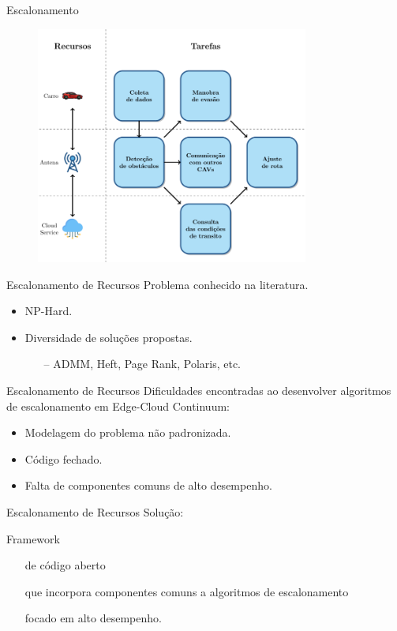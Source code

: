 \begin{frame}{Escalonamento}
    \begin{figure}
        \centering
        \includegraphics[width=0.8\textwidth]{Figuras/cav-scheduling.png}
    \end{figure}
\end{frame}

\begin{frame}{Escalonamento de Recursos}
    Problema conhecido na literatura.
    \begin{itemize}
        \item NP-Hard.
        \item Diversidade de soluções propostas.
        \begin{itemize}
            \item[--] ADMM, Heft, Page Rank, Polaris, etc.
        \end{itemize}
    \end{itemize}
\end{frame}

\begin{frame}{Escalonamento de Recursos}
    Dificuldades encontradas ao desenvolver algoritmos de escalonamento em Edge-Cloud Continuum:
    \begin{itemize}
        \item Modelagem do problema não padronizada.
        \item Código fechado.
        \item Falta de componentes comuns de alto desempenho.
    \end{itemize}
\end{frame}

\begin{frame}{Escalonamento de Recursos}
    Solução:

    Framework
    \begin{itemize}
        \item[] de código aberto
        \item[] que incorpora componentes comuns a algoritmos de escalonamento
        \item[] focado em alto desempenho.
    \end{itemize}
\end{frame}